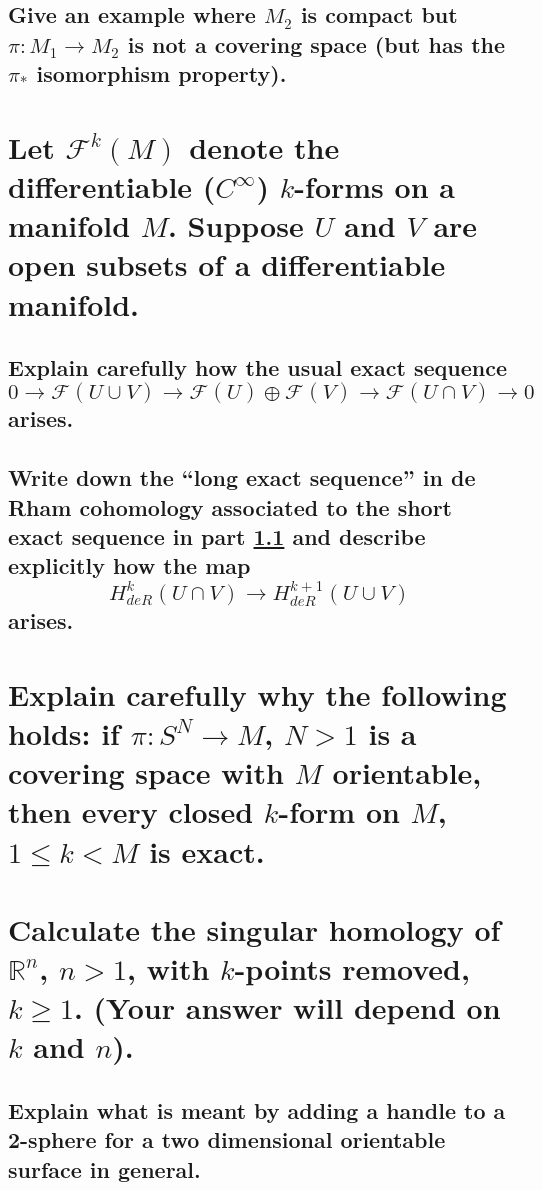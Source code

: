 \documentclass[10pt]{article}
\begin{document}
\subsection{Give an example where $M_2$ is compact but $\pi: M_1 \to M_2$ is not a covering space
  (but has the $\pi_*$ isomorphism property). }

\section{Let $\mathcal{F}^k(M)$ denote the differentiable ($C^\infty$) $k$-forms on a manifold
  $M$. Suppose $U$ and $V$ are open subsets of a differentiable manifold.}

\subsection{Explain carefully how the usual exact sequence
  $$0 \to \mathcal{F}(U \cup V) \to \mathcal{F}(U) \oplus \mathcal{F}(V) \to \mathcal{F}(U \cap V)
  \to 0$$
  arises.}
\label{ues}

\subsection{Write down the ``long exact sequence'' in de Rham cohomology associated to the short
  exact sequence in part \ref{ues} and describe explicitly how the map
  $$H^k_{deR}(U \cap V) \to H^{k+1}_{deR}( U \cup V)$$
  arises.}

\section{Explain carefully why the following holds: if $\pi: S^N \to M$, $N > 1$ is a covering space
  with $M$ orientable, then every closed $k$-form on $M$, $1 \leq k < M$ is exact. }

\section{Calculate the singular homology of $\mathbb{R}^n$, $n > 1$, with $k$-points removed, $k
  \geq 1$. (Your answer will depend on $k$ and $n$).}

\advsection{}

\subsection{Explain what is meant by adding a handle to a 2-sphere for a two dimensional orientable
  surface in general.}
\end{document}
